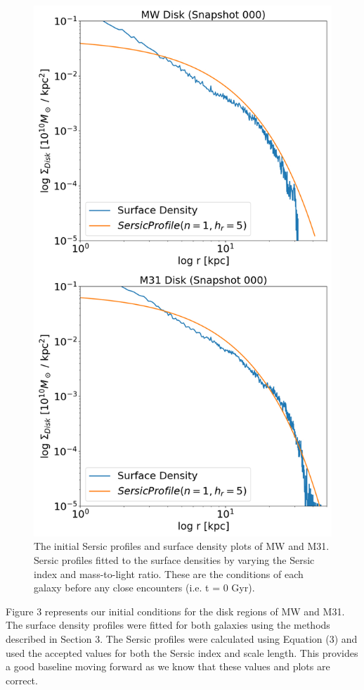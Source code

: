 \documentclass[linenumbers,trackchanges,twocolumn]{aastex7}
\begin{document}
\begin{figure}[h!]
\centering
\includegraphics[scale=0.2]{ResultsV_000.jpg}
\caption{The initial Sersic profiles and surface density plots of MW and M31. Sersic profiles fitted to the surface densities by varying the Sersic index and mass-to-light ratio. These are the conditions of each galaxy before any close encounters (i.e. t = 0 Gyr).
\label{fig:general}}
\end{figure}

Figure 3 represents our initial conditions for the disk regions of MW
and M31. The surface density profiles were fitted for both galaxies
using the methods described in Section 3. The Sersic profiles were
calculated using Equation (3) and used the accepted values for both the Sersic index and scale length. This provides a good baseline moving forward as we know that these values and plots are correct.
\end{document}
